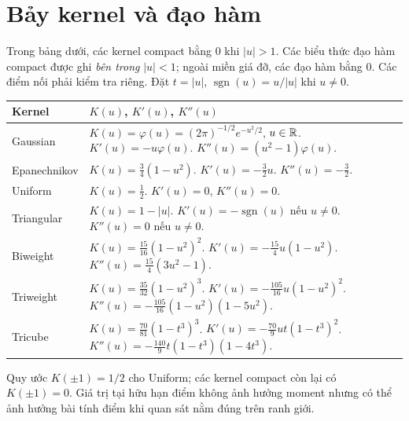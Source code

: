 \section{Bảy kernel và đạo hàm}
Trong bảng dưới, các kernel compact bằng 0 khi $|u|>1$.
Các biểu thức đạo hàm compact được ghi \emph{bên trong} $|u|<1$;
ngoài miền giá đỡ, các đạo hàm bằng 0. Các điểm nối phải kiểm tra riêng.
Đặt $t=|u|$, $\operatorname{sgn}(u)=u/|u|$ khi $u\ne0$.
\begin{longtable}{p{}p{}}
\toprule Kernel & $K(u)$, $K'(u)$, $K''(u)$\\\midrule\endhead
Gaussian & $K(u)=\varphi(u)=(2\pi)^{-1/2}e^{-u^2/2}$, $u\in\mathbb R$.
\newline $K'(u)=-u\varphi(u)$.
\newline $K''(u)=(u^2-1)\varphi(u)$.\\[5pt]
Epanechnikov & $K(u)=\frac34(1-u^2)$.
\newline $K'(u)=-\frac32u$.
\newline $K''(u)=-\frac32$.\\[5pt]
Uniform & $K(u)=\frac12$.
\newline $K'(u)=0$, $K''(u)=0$.\\[5pt]
Triangular & $K(u)=1-|u|$.
\newline $K'(u)=-\operatorname{sgn}(u)$ nếu $u\ne0$.
\newline $K''(u)=0$ nếu $u\ne0$.\\[5pt]
Biweight & $K(u)=\frac{15}{16}(1-u^2)^2$.
\newline $K'(u)=-\frac{15}{4}u(1-u^2)$.
\newline $K''(u)=\frac{15}{4}(3u^2-1)$.\\[5pt]
Triweight & $K(u)=\frac{35}{32}(1-u^2)^3$.
\newline $K'(u)=-\frac{105}{16}u(1-u^2)^2$.
\newline $K''(u)=-\frac{105}{16}(1-u^2)(1-5u^2)$.\\[5pt]
Tricube & $K(u)=\frac{70}{81}(1-t^3)^3$.
\newline $K'(u)=-\frac{70}{9}ut(1-t^3)^2$.
\newline $K''(u)=-\frac{140}{9}t(1-t^3)(1-4t^3)$.\\
\bottomrule
\end{longtable}
Quy ước $K(\pm1)=1/2$ cho Uniform; các kernel compact còn lại có
$K(\pm1)=0$. Giá trị tại hữu hạn điểm không ảnh hưởng moment nhưng có
thể ảnh hưởng bài tính điểm khi quan sát nằm đúng trên ranh giới.

